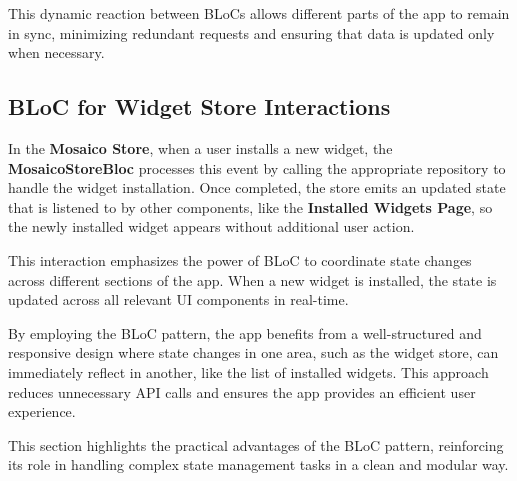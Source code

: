 This dynamic reaction between BLoCs allows different parts of the app to remain in sync, minimizing redundant requests and ensuring that data is updated only when necessary.

\subsection{BLoC for Widget Store Interactions}

In the \textbf{Mosaico Store}, when a user installs a new widget, the \textbf{MosaicoStoreBloc} processes this event by calling the appropriate repository to handle the widget installation. Once completed, the store emits an updated state that is listened to by other components, like the \textbf{Installed Widgets Page}, so the newly installed widget appears without additional user action.

This interaction emphasizes the power of BLoC to coordinate state changes across different sections of the app. When a new widget is installed, the state is updated across all relevant UI components in real-time.

By employing the BLoC pattern, the app benefits from a well-structured and responsive design where state changes in one area, such as the widget store, can immediately reflect in another, like the list of installed widgets. This approach reduces unnecessary API calls and ensures the app provides an efficient user experience.

This section highlights the practical advantages of the BLoC pattern, reinforcing its role in handling complex state management tasks in a clean and modular way.